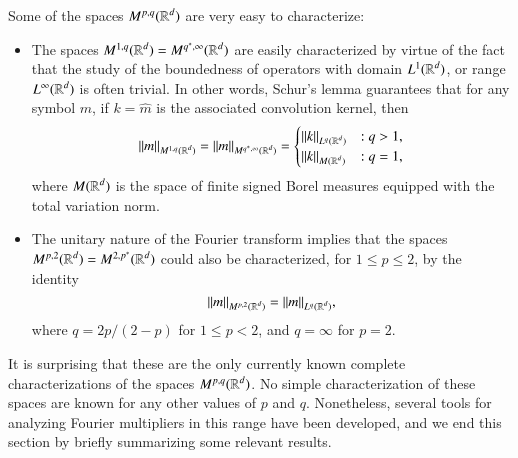 Some of the spaces $M^{p,q}(\operatorname{\mathbb{R}}^d)$ are very easy to characterize:
%
\begin{itemize}
    \item The spaces $M^{1,q}(\operatorname{\mathbb{R}}^d) = M^{q^*,\infty}(\operatorname{\mathbb{R}}^d)$ are easily characterized by virtue of the fact that the study of the boundedness of operators with domain $L^1(\operatorname{\mathbb{R}}^d)$, or range $L^\infty(\operatorname{\mathbb{R}}^d)$ is often trivial. In other words, Schur's lemma guarantees that for any symbol $m$, if $k = \widehat{m}$ is the associated convolution kernel, then
    \[ \| m \|_{M^{1,q}(\operatorname{\mathbb{R}}^d)} = \| m \|_{M^{q^*,\infty}(\operatorname{\mathbb{R}}^d)} = \begin{cases} \| k \|_{L^q(\operatorname{\mathbb{R}}^d)} &: q > 1, \\ \| k \|_{M(\operatorname{\mathbb{R}}^d)} &: q = 1, \end{cases} \]
    where $M(\operatorname{\mathbb{R}}^d)$ is the space of finite signed Borel measures equipped with the total variation norm.

    \item The unitary nature of the Fourier transform implies that the spaces $M^{p,2}(\operatorname{\mathbb{R}}^d) = M^{2,p^*}(\operatorname{\mathbb{R}}^d)$ could also be characterized, for $1 \leq p \leq 2$, by the identity
    \[ \| m \|_{M^{p,2}(\operatorname{\mathbb{R}}^d)} = \| m \|_{L^q(\operatorname{\mathbb{R}}^d)}, \]
    where $q = 2p/(2-p)$ for $1 \leq p < 2$, and $q = \infty$ for $p = 2$.
\end{itemize}
%
It is surprising that these are the only currently known complete characterizations of the spaces $M^{p,q}(\operatorname{\mathbb{R}}^d)$. No simple characterization of these spaces are known for any other values of $p$ and $q$. Nonetheless, several tools for analyzing Fourier multipliers in this range have been developed, and we end this section by briefly summarizing some relevant results.

